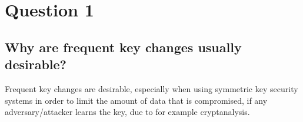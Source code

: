 \documentclass{report}
\begin{document}
	\section{Question 1}
	\startsection
		\renewcommand{\thesubsection}{\thesection.\Alph{subsection}}
		\subsection{Why are frequent key changes usually desirable?}
		\startsubsection
			Frequent key changes are desirable, especially when using symmetric key security systems in order to limit the amount of data that is compromised, if any adversary/attacker learns the key, due to for example cryptanalysis.
		\closesection
	\closesection
\end{document}

